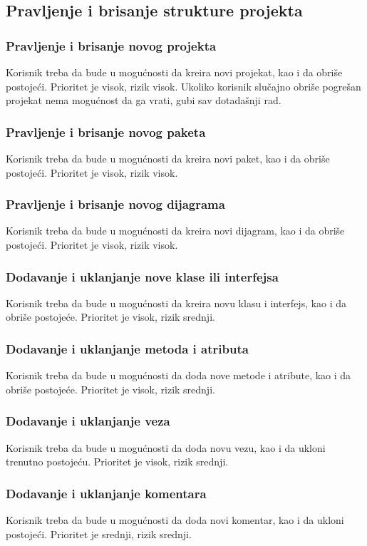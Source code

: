 \documentclass[a4paper]{article}
\begin{document}
\subsection{Pravljenje i brisanje strukture projekta}
\subsubsection{Pravljenje i brisanje novog projekta}
Korisnik treba da bude u mogućnosti da kreira novi projekat, kao i da obriše postojeći. Prioritet je visok, rizik visok. Ukoliko korisnik slučajno obriše pogrešan projekat nema mogućnost da ga vrati, gubi sav dotadašnji rad.  
\subsubsection{Pravljenje i brisanje novog paketa}
Korisnik treba da bude u mogućnosti da kreira novi paket, kao i da obriše postojeći. Prioritet je visok, rizik visok. 
\subsubsection{Pravljenje i brisanje novog dijagrama}
Korisnik treba da bude u mogućnosti da kreira novi dijagram, kao i da obriše postojeći. Prioritet je visok, rizik visok.  
\subsubsection{Dodavanje i uklanjanje nove klase ili interfejsa}
Korisnik treba da bude u mogućnosti da kreira novu klasu i interfejs, kao i da obriše postojeće. Prioritet je visok, rizik srednji.  
\subsubsection{Dodavanje i uklanjanje metoda i atributa}
Korisnik treba da bude u mogućnosti da doda nove metode i atribute, kao i da obriše postojeće. Prioritet je visok, rizik srednji.  
\subsubsection{Dodavanje i uklanjanje veza} 
Korisnik treba da bude u mogućnosti da doda novu vezu, kao i da ukloni trenutno postojeću. Prioritet je visok, rizik srednji.  
\subsubsection{Dodavanje i uklanjanje komentara}
Korisnik treba da bude u mogućnosti da doda novi komentar, kao i da ukloni postojeći. Prioritet je srednji, rizik srednji.  
\end{document}
